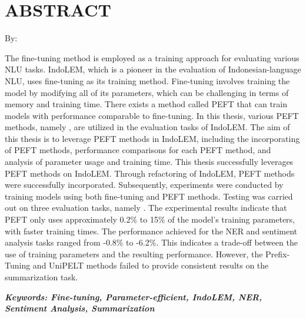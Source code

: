 \clearpage
\chapter*{ABSTRACT}

\begin{center}
    \center
    \begin{singlespace}
        \large\bfseries\MakeUppercase{\titleen}
    
        \normalfont\normalsize
        By:
    
        \bfseries \theauthor
    \end{singlespace}
\end{center} 

\begin{singlespace}
    The fine-tuning method is employed as a training approach for evaluating various NLU tasks. IndoLEM, which is a pioneer in the evaluation of Indonesian-language NLU, uses fine-tuning as its training method. Fine-tuning involves training the model by modifying all of its parameters, which can be challenging in terms of memory and training time. There exists a method called PEFT that can train models with performance comparable to fine-tuning. In this thesis, various PEFT methods, namely \methodPEFT, are utilized in the evaluation tasks of IndoLEM. The aim of this thesis is to leverage PEFT methods in IndoLEM, including the incorporating of PEFT methods, performance comparisons for each PEFT method, and analysis of parameter usage and training time.
    This thesis successfully leverages PEFT methods on IndoLEM. Through refactoring of IndoLEM, PEFT methods were successfully incorporated. Subsequently, experiments were conducted by training models using both fine-tuning and PEFT methods. Testing was carried out on three evaluation tasks, namely \nlptask. The experimental results indicate that PEFT only uses approximately 0.2\% to 15\% of the model's training parameters, with faster training times. The performance achieved for the NER and sentiment analysis tasks ranged from -0.8\% to -6.2\%. This indicates a trade-off between the use of training parameters and the resulting performance. However, the Prefix-Tuning and UniPELT methods failed to provide consistent results on the summarization task.

    \textit{\textbf{Keywords: Fine-tuning, Parameter-efficient, IndoLEM, NER, Sentiment Analysis, Summarization}}
\end{singlespace}

\clearpage
